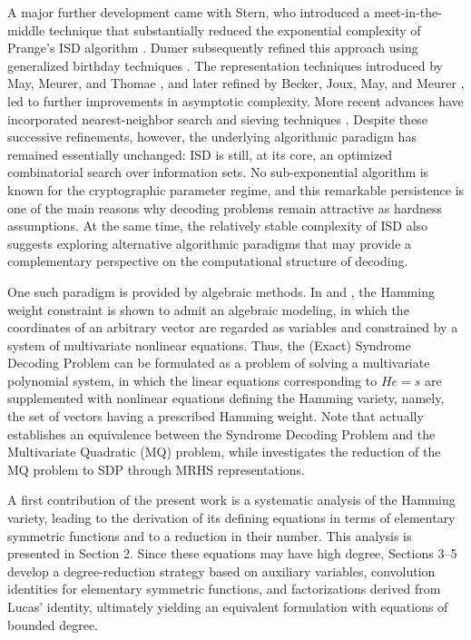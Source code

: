 \documentclass{amsart}
\begin{document}
A major further development came with Stern, who introduced a meet-in-the-middle
technique that substantially reduced the exponential complexity of Prange's ISD
algorithm \cite{Stern}. Dumer subsequently refined this approach using generalized
birthday techniques \cite{Dumer}. The representation techniques introduced by May, Meurer,
and Thomae \cite{MMT}, and later refined by Becker, Joux, May, and Meurer \cite{BJMM},
led to further improvements in asymptotic complexity. More recent advances have incorporated
nearest-neighbor search and sieving techniques \cite{MayOzerov}. Despite these successive
refinements, however, the underlying algorithmic paradigm has remained essentially unchanged:
ISD is still, at its core, an optimized combinatorial search over information sets.
No sub-exponential algorithm is known for the cryptographic parameter regime, and this
remarkable persistence is one of the main reasons why decoding problems remain attractive
as hardness assumptions. At the same time, the relatively stable complexity of ISD
also suggests exploring alternative algorithmic paradigms that may provide a complementary
perspective on the computational structure of decoding.

One such paradigm is provided by algebraic methods. In \cite{MPS} and \cite{CCMMP},
the Hamming weight constraint is shown to admit an algebraic modeling, in which
the coordinates of an arbitrary vector are regarded as variables and constrained by
a system of multivariate nonlinear equations. Thus, the (Exact) Syndrome Decoding Problem
can be formulated as a problem of solving a multivariate polynomial system, in which
the linear equations corresponding to $H e = s$ are supplemented with nonlinear equations
defining the Hamming variety, namely, the set of vectors having a prescribed Hamming weight.
Note that \cite{MPS} actually establishes an equivalence between the Syndrome Decoding Problem
and the Multivariate Quadratic (MQ) problem, while \cite{Zajac} investigates the reduction
of the MQ problem to SDP through MRHS representations.

A first contribution of the present work is a systematic analysis of the Hamming variety,
leading to the derivation of its defining equations in terms of elementary symmetric functions
and to a reduction in their number. This analysis is presented in Section 2. Since these equations
may have high degree, Sections 3--5 develop a degree-reduction strategy based on auxiliary variables,
convolution identities for elementary symmetric functions, and factorizations derived from
Lucas' identity, ultimately yielding an equivalent formulation with equations of bounded degree.
\end{document}
